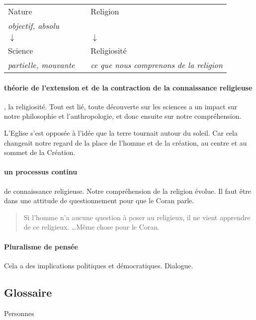 \begin{tabular}{p{5cm}p{1cm}p{5cm}}
Nature &  & Religion   \\
\textit{{objectif, absolu} }      \\                        
          $ \downarrow $  &  &         $ \downarrow $  \\
Science &  & Religiosité\\
\textit{{partielle, mouvante}}  & & \textit{ce que nous comprenons de la religion} \\
\end{tabular}
 


\paragraph{théorie de l'extension et de la contraction de la connaissance religieuse}, la religiosité. Tout est lié, toute découverte sur les sciences a un impact sur notre philosophie et l'anthropologie, et donc ensuite sur notre compréhension.


\begin{Ex}
L'Eglise s'est opposée à l'idée que la terre tournait autour du soleil. Car cela changeait notre regard de la place de l'homme et de la création, au centre et au sommet de la Création.
\end{Ex}

\paragraph{un processus continu} de connaissance religieuse. Notre compréhension de la religion évolue. Il faut être dans une attitude de questionnement pour que le Coran parle. 
\begin{quote}
    Si l'homme n'a aucune question à poser au religieux, il ne vient apprendre de ce religieux. \ldots Même chose pour le Coran.
\end{quote}

\paragraph{Pluralisme de pensée}
Cela a des implications politiques et démocratiques. Dialogue.

\subsection{Glossaire}

 
{Personnes}



